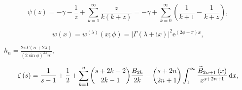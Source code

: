 \[\psi\left(z\right)=-\gamma-\frac{1}{z}+\sum_{k=1}^{\infty}\frac{z}{k(k+z)}=-%
\gamma+\sum_{k=0}^{\infty}\left(\frac{1}{k+1}-\frac{1}{k+z}\right),\]

\[w(x)=w^{(\lambda)}(x;\phi)=\left|\Gamma\left(\lambda+\mathrm{i}x\right)\right|%
^{2}{\mathrm{e}}^{(2\phi-\pi)x},\]

$h_{n}=\frac{2\pi\Gamma\left(n+2\lambda\right)}{(2\sin\phi)^{2\lambda}n!},$

\[\zeta\left(s\right)=\frac{1}{s-1}+\frac{1}{2}+\sum_{k=1}^{n}\genfrac{(}{)}{0.0%
pt}{}{s+2k-2}{2k-1}\frac{B_{2k}}{2k}-\genfrac{(}{)}{0.0pt}{}{s+2n}{2n+1}\int_{%
1}^{\infty}\frac{\widetilde{B}_{2n+1}\left(x\right)}{x^{s+2n+1}}\,\mathrm{d}x,\]


